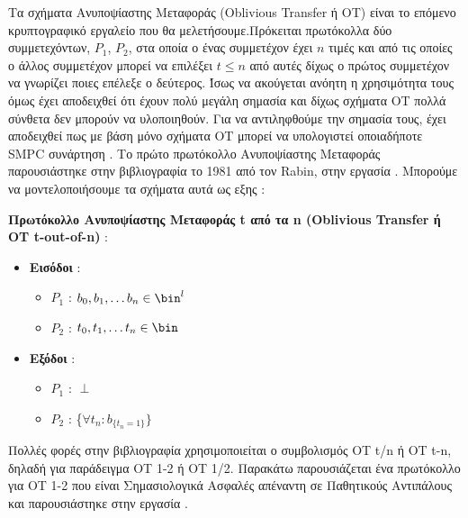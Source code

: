Τα σχήματα Ανυποψίαστης Μεταφοράς (Oblivious Transfer ή OT) είναι το επόμενο κρυπτογραφικό εργαλείο που θα μελετήσουμε.Πρόκειται πρωτόκολλα δύο συμμετεχόντων, $P_1$, $P_2$, στα οποία ο ένας συμμετέχον έχει $n$ τιμές και από τις οποίες ο άλλος συμμετέχον μπορεί να επιλέξει $t \le n$ από αυτές δίχως ο πρώτος συμμετέχον να γνωρίζει ποιες επέλεξε ο δεύτερος. Ίσως να ακούγεται ανόητη η χρησιμότητα τους όμως έχει αποδειχθεί ότι έχουν πολύ μεγάλη σημασία και δίχως σχήματα OT πολλά σύνθετα δεν μπορούν να υλοποιηθούν. Για να αντιληφθούμε την σημασία τους, έχει αποδειχθεί πως με βάση μόνο σχήματα OT μπορεί να υπολογιστεί οποιαδήποτε SMPC συνάρτηση \cite{10.1561/3300000019}. Το πρώτο πρωτόκολλο Ανυποψίαστης Μεταφοράς παρουσιάστηκε στην βιβλιογραφία το 1981 από τον Rabin, στην εργασία \cite{cryptoeprint:2005/187}. Μπορούμε να μοντελοποιήσουμε τα σχήματα αυτά ως εξης :

\begin{definition}
\textbf{Πρωτόκολλο Ανυποψίαστης Μεταφοράς t από τα n (Oblivious Transfer ή ΟΤ t-out-of-n)} :
\begin{itemize}
    \item \textbf{Εισόδοι} :
        \begin{itemize}
            \item $P_1$ : $b_{0}, b_{1}, \ldots b_{n} \in \bin^l$
            \item $P_2$ : $t_{0}, t_{1}, \ldots t_{n} \in \bin$
        \end{itemize}
    \item \textbf{Εξόδοι} :
        \begin{itemize}
            \item $P_1$ : $\perp$
            \item $P_2$ : \{$\forall t_n : b_{\{t_n = 1\}}\}$
        \end{itemize}
\end{itemize}
\end{definition}

Πολλές φορές στην βιβλιογραφία χρησιμοποιείται ο συμβολισμός OT t/n ή OT t-n, δηλαδή για παράδειγμα OT 1-2 ή OT 1/2. Παρακάτω παρουσιάζεται ένα πρωτόκολλο για OT 1-2 που είναι Σημασιολογικά Ασφαλές απέναντη σε Παθητικούς Αντιπάλους και παρουσιάστηκε στην εργασία \cite{even1985randomized}.

